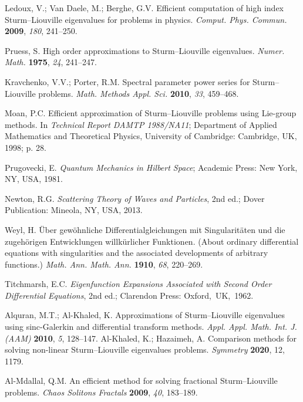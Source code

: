 \documentclass[symmetry,article,accept,moreauthors,pdftex,a4paper]{mdpi}
\begin{document}
\begin{thebibliography}{99}
 Ledoux, V.; Van Daele, M.; Berghe, G.V. Efficient computation of high index Sturm--Liouville eigenvalues for problems in physics. \textit{Comput. Phys. Commun.} \textbf{2009}, \emph{180}, 241--250.

 Pruess, S. High order approximations to Sturm--Liouville eigenvalues. \textit{Numer. Math.} \textbf{1975}, \emph{24}, 241--247.

 Kravchenko, V.V.; Porter, R.M. Spectral parameter power series for Sturm--Liouville problems. \textit{Math. Methods Appl. Sci.} \textbf{2010}, \emph{33}, 459--468.

 Moan, P.C. Efficient approximation of Sturm--Liouville problems using Lie-group methods. In \textit{Technical Report DAMTP 1988/NA11}; Department of Applied Mathematics and Theoretical Physics, University of Cambridge: Cambridge, UK, 1998; p. 28.

 Prugovecki, E. \textit{Quantum Mechanics in Hilbert Space}; Academic Press: New York, NY, USA, 1981.

 Newton, R.G. \textit{Scattering Theory of Waves and Particles}, 2nd ed.; Dover Publication: Mineola, NY, USA, 2013.

 Weyl, H. Über gewöhnliche Differentialgleichungen mit Singularitäten und die zugehörigen Entwicklungen willkürlicher Funktionen. (About ordinary differential equations with singularities and the associated developments of arbitrary functions.) \textit{Math. Ann. Math. Ann.} \textbf{1910}, \emph{68}, 220--269.

 Titchmarsh, E.C. \textit{Eigenfunction Expansions Associated with Second Order Differential Equations}, 2nd ed.; Clarendon Press: \mbox{Oxford, UK, 1962.}

 Alquran, M.T.; Al-Khaled, K. Approximations of Sturm--Liouville eigenvalues using sinc-Galerkin and differential transform methods. \textit{Appl. Appl. Math. Int. J. (AAM)} \textbf{2010}, \emph{5}, 128--147.
 Al-Khaled, K.; Hazaimeh, A. Comparison methods for solving non-linear Sturm--Liouville eigenvalues problems. \textit{Symmetry} \textbf{2020}, 12, 1179. 

 Al-Mdallal, Q.M. An efficient method for solving fractional Sturm--Liouville problems. \textit{Chaos Solitons Fractals} \textbf{2009}, \emph{40}, 183--189.


\end{thebibliography}
\end{document}
